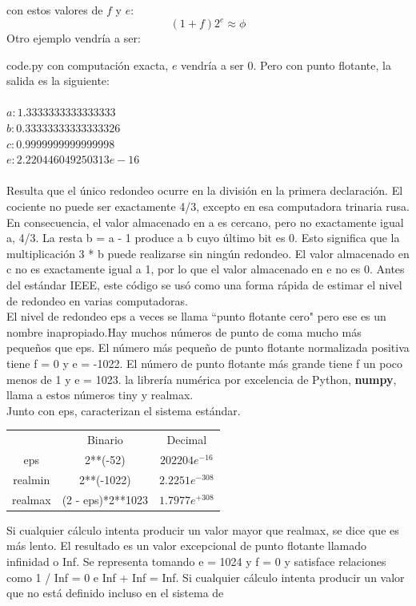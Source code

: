 \documentclass[12pt]{article}
\begin{document}
con estos valores de $f$ y $e$:
$$(1+f)2^e \approx \phi$$
Otro ejemplo vendr\'ia a ser:

{code.py}
con computaci\'on exacta, $e$ vendr\'ia a ser 0. Pero con punto flotante, la salida es la siguiente:\\\\
$a: 1.3333333333333333$\\
$b: 0.33333333333333326$\\
$c: 0.9999999999999998$\\
$e: 2.220446049250313e-16$\\\\
Resulta que el único redondeo ocurre en la división en la primera declaración. El cociente no
puede ser exactamente 4/3, excepto en esa computadora trinaria rusa. En consecuencia, el
valor almacenado en a es cercano, pero no exactamente igual a, 4/3. La resta b = a - 1
produce a b cuyo último bit es 0. Esto significa que la multiplicación 3 * b puede realizarse sin
ningún redondeo. El valor almacenado en c no es exactamente igual a 1, por lo que el valor
almacenado en e no es 0. Antes del estándar IEEE, este código se usó como una forma
rápida de estimar el nivel de redondeo en varias computadoras.\\
El nivel de redondeo eps a veces se llama “punto flotante cero" pero ese es un nombre
inapropiado.Hay muchos números de punto de coma mucho más pequeños que eps. El número más
pequeño de punto flotante normalizada positiva tiene f = 0 y e = -1022. El número de punto
flotante más grande tiene f un poco menos de 1 y e = 1023. la librer\'ia num\'erica por excelencia de Python, \textbf{numpy}, llama a estos números
tiny y realmax.\\
Junto con eps, caracterizan el sistema estándar.
\begin{center}
  \begin{tabular}{c c c}
    & Binario & Decimal\\
    eps & 2**(-52) & $202204e^{-16}$\\
    realmin & 2**(-1022) & $2.2251e^{-308}$\\
    realmax & (2 - eps)*2**1023 & $1.7977e^{+308}$
  \end{tabular}
\end{center}
Si cualquier cálculo intenta producir un valor mayor que realmax, se dice que es más lento.
El resultado es un valor excepcional de punto flotante llamado infinidad o Inf. Se representa
tomando e = 1024 y f = 0 y satisface relaciones como 1 / Inf = 0 e Inf + Inf = Inf.
Si cualquier cálculo intenta producir un valor que no está definido incluso en el sistema de
\end{document}
